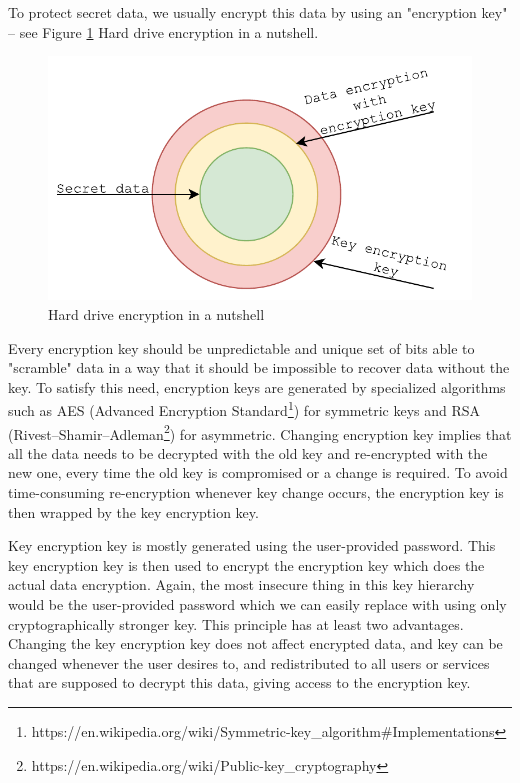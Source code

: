 To protect secret data, we usually encrypt this data by using an "encryption key" -- see Figure \ref{fig_encdata} Hard drive encryption in a nutshell.
\begin{figure}[h]
    \centering
    \includegraphics[scale=0.7]{figures/HowWeEncryptData.pdf}
    \caption{Hard drive encryption in a nutshell}
    \label{fig_encdata}
\end{figure}
Every encryption key should be unpredictable and unique set of bits able to "scramble" data in a way that it should be impossible to recover data without the key.
To satisfy this need, encryption keys are generated by specialized algorithms such as AES (Advanced Encryption Standard\footnote{https://en.wikipedia.org/wiki/Symmetric-key\_algorithm\#Implementations}) for symmetric keys and RSA (Rivest–Shamir–Adleman\footnote{https://en.wikipedia.org/wiki/Public-key\_cryptography}) for asymmetric.
Changing encryption key implies that all the data needs to be decrypted with the old key and re-encrypted with the new one, every time the old key is compromised or a change is required.
To avoid time-consuming re-encryption whenever key change occurs, the encryption key is then wrapped by the key encryption key.

Key encryption key is mostly generated using the user-provided password.
This key encryption key is then used to encrypt the encryption key which does the actual data encryption.
Again, the most insecure thing in this key hierarchy would be the user-provided password which we can easily replace with using only cryptographically stronger key.
This principle has at least two advantages.
Changing the key encryption key does not affect encrypted data, and key can be changed whenever the user desires to, and redistributed to all users or services that are supposed to decrypt this data, giving access to the encryption key.

